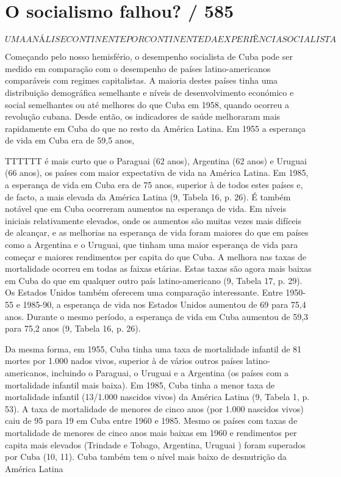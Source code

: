 \section{O socialismo falhou? / 585}
 \par 
\[UMA ANÁLISE CONTINENTE POR CONTINENTE DA EXPERIÊNCIA SOCIALISTA\]
 \par 
Começando pelo nosso hemisfério, o desempenho socialista de Cuba pode ser medido em comparação com o desempenho de países latino-americanos comparáveis ​​com regimes capitalistas. A maioria destes países tinha uma distribuição demográfica semelhante e níveis de desenvolvimento económico e social semelhantes ou até melhores do que Cuba em 1958, quando ocorreu a revolução cubana. Desde então, os indicadores de saúde melhoraram mais rapidamente em Cuba do que no resto da América Latina. Em 1955 a esperança de vida em Cuba era de 59,5 anos,
 \par 
TTTTTT é mais curto que o Paraguai (62 anos), Argentina (62 anos) e Uruguai (66 anos), os países com maior expectativa de vida na América Latina. Em 1985, a esperança de vida em Cuba era de {\color{blue}75} anos, superior à de todos estes países e, de facto, a mais elevada da América Latina (9, Tabela 16, p. {\color{blue}26}). É também notável que em Cuba ocorreram aumentos na esperança de vida. Em níveis iniciais relativamente elevados, onde os aumentos são muitas vezes mais difíceis de alcançar, e as melhorias na esperança de vida foram maiores do que em países como a Argentina e o Uruguai, que tinham uma maior esperança de vida para começar e maiores rendimentos per capita do que Cuba. A melhora nas taxas de mortalidade ocorreu em todas as faixas etárias. Estas taxas são agora mais baixas em Cuba do que em qualquer outro país latino-americano (9, Tabela 17, p. {\color{blue}29}). Os Estados Unidos também oferecem uma comparação interessante. Entre 1950-55 e 1985-90, a esperança de vida nos Estados Unidos aumentou de {\color{blue}69} para 75,4 anos. Durante o mesmo período, a esperança de vida em Cuba aumentou de 59,3 para 75,2 anos (9, Tabela 16, p. {\color{blue}26}).
 \par 
Da mesma forma, em 1955, Cuba tinha uma taxa de mortalidade infantil de {\color{blue}81} mortes por {\color{blue}1}.{\color{blue}000} nados vivos, superior à de vários outros países latino-americanos, incluindo o Paraguai, o Uruguai e a Argentina (os países com a mortalidade infantil mais baixa). Em 1985, Cuba tinha a menor taxa de mortalidade infantil (13/1.{\color{blue}000} nascidos vivos) da América Latina (9, Tabela 1, p. {\color{blue}53}). A taxa de mortalidade de menores de cinco anos (por {\color{blue}1}.{\color{blue}000} nascidos vivos) caiu de {\color{blue}95} para {\color{blue}19} em Cuba entre 1960 e 1985. Mesmo os países com taxas de mortalidade de menores de cinco anos mais baixas em 1960 e rendimentos per capita mais elevados (Trindade e Tobago, Argentina, Uruguai ) foram superados por Cuba (10, {\color{blue}11}). Cuba também tem o nível mais baixo de desnutrição da América Latina
 \par 
